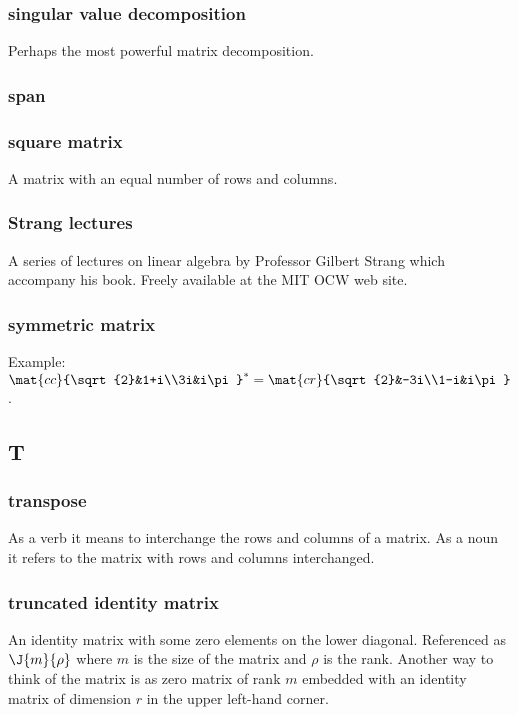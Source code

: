 \subsubsection*{singular value decomposition}
Perhaps the most powerful matrix decomposition.

\subsubsection*{span}

\subsubsection*{square matrix}
A matrix with an equal number of rows and columns.

\subsubsection*{Strang lectures}
A series of lectures on linear algebra by Professor Gilbert Strang which accompany his book. Freely available at the MIT OCW web site.

\subsubsection*{symmetric matrix}
Example: $\mat{cc}{\sqrt{2}&1+i\\3i&i\pi}^{*}=\mat{cr}{\sqrt{2}&-3i\\1-i&i\pi}$.

\subsection*{T} 

\subsubsection*{transpose}
As a verb it means to interchange the rows and columns of a matrix. As a noun it refers to the matrix with rows and columns interchanged.

\subsubsection*{truncated identity matrix}
An identity matrix with some zero elements on the lower diagonal. Referenced as $\J{m}{\rho}$ where $m$ is the size of the matrix and $\rho$ is the rank. Another way to think of the matrix is as zero matrix of rank $m$ embedded with an identity matrix of dimension $r$ in the upper left-hand corner.

